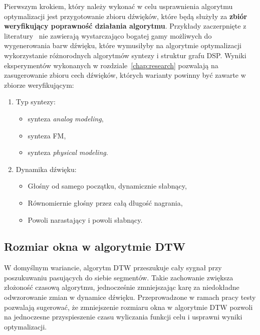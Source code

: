 Pierwszym krokiem, który należy wykonać w celu usprawnienia
algorytmu optymalizacji jest przygotowanie zbioru dźwięków,
które będą służyły za \textbf{zbiór weryfikujący poprawność działania algorytmu}.
Przykłady zaczerpnięte z literatury~\cite{evolutionary_puredata_results}
nie zawierają wystarczająco bogatej gamy możliwych do wygenerowania
barw dźwięku, które wymusiłyby na algorytmie optymalizacji wykorzystanie
różnorodnych algorytmów syntezy i struktur grafu DSP\@. Wyniki
eksperymentów wykonanych w rozdziale~\ref{chap:research} pozwalają
na zasugerowanie zbioru cech dźwięków, których warianty
powinny być zawarte w zbiorze weryfikującym:

\begin{enumerate}
  \item Typ syntezy:
  \begin{itemize}
    \item synteza \textit{analog modeling},
    \item synteza FM,
    \item synteza \textit{physical modeling}.
  \end{itemize}
  \item Dynamika dźwięku:
    \begin{itemize}
      \item Głośny od samego początku, dynamicznie słabnący,
      \item Równomiernie głośny przez całą długość nagrania,
      \item Powoli narastający i powoli słabnący.
    \end{itemize}
\end{enumerate}



\subsection{Rozmiar okna w algorytmie DTW}

W domyślnym wariancie, algorytm DTW przeszukuje cały sygnał
przy poszukuwaniu pasujących do siebie segmentów. Takie
zachowanie zwiększa złożoność czasową algorytmu, jednocześnie
zmniejszając karę za niedokładne odwzorowanie zmian w dynamice dźwięku.
Przeprowadzone w ramach pracy testy pozwalają sugerować, że zmniejszenie
rozmiaru okna w algorytmie DTW pozwoli na jednoczesne przyspieszenie czasu
wyliczania funkcji celu i usprawni wyniki optymalizacji.

